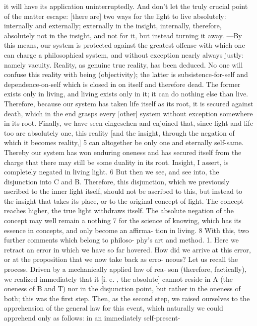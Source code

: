 it will have its application uninterruptedly.
 And don’t let the truly crucial
point of the matter escape: [there are] two ways for the light to live
absolutely: internally and externally; externally in the insight, internally,
therefore, absolutely not in the insight, and not for it, but instead turning it
away.
—By this means, our system is protected against the greatest offense
with which one can charge a philosophical system, and without exception
nearly always justly: namely vacuity.
 Reality, as genuine true reality, has been
deduced.
 No one will confuse this reality with being (objectivity); the latter
is subsistence-for-self and dependence-on-self which is closed in on itself and
therefore dead.
 The former exists only in living, and living exists only in it; it
can do nothing else than live.
 Therefore, because our system has taken life
itself as its root, it is secured against death, which in the end grasps every
[other] system without exception somewhere in its root.
 Finally, we have seen
{eingesehen} and enjoined that, since light and life too are absolutely one, this
reality [and the insight, through the negation of which it becomes reality,] 5
can altogether be only one and eternally self-same.
 Thereby our
system has won enduring oneness and has secured itself from the charge that
there may still be some duality in its root.
Insight, I assert, is completely negated in living light.
 6 But then we see,
and see into, the disjunction into C and B.
 Therefore, this disjunction, which
we previously ascribed to the inner light itself, should not be ascribed to this,
but instead to the insight that takes its place, or to the original concept of
light.
 The concept reaches higher, the true light withdraws itself.
 The
absolute negation of the concept may well remain a nothing 7 for the science
of knowing, which has its essence in concepts, and only become an affirma-
tion in living.
 8 With this, two further comments which belong to philoso-
phy’s art and method.
1.
 Here we retract an error in which we have so far hovered.
 How did
we arrive at this error, or at the proposition that we now take back as erro-
neous? Let us recall the process.
 Driven by a mechanically applied law of rea-
son (therefore, factically), we realized immediately that it [i.
e.
, the absolute]
cannot reside in A (the oneness of B and T) nor in the disjunction point, but
rather in the oneness of both; this was the first step.
 Then, as the second step,
we raised ourselves to the apprehension of the general law for this event, which
naturally we could apprehend only as follows: in an immediately self-present-
